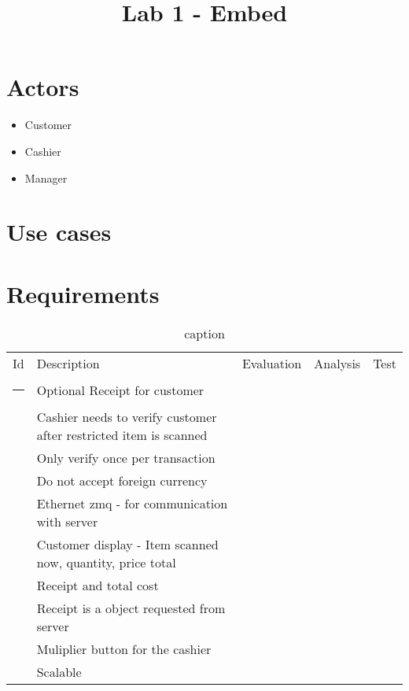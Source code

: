 \documentclass{article}
\begin{document}
\title{Lab 1 - Embed}
\date{}
\maketitle

\section{Actors}

\begin{itemize}
    \item Customer
    \item Cashier
    \item Manager
\end{itemize}

\section{Use cases}


\section{Requirements}
\begin{table}[htpb]
    \centering
    \begin{tabular}{lllll}
        Id& Description  & Evaluation  & Analysis & Test\\
        \hrule
        & Optional Receipt for customer &&& \\
        & Cashier needs to verify customer after restricted item is scanned&&&\\
        & Only verify once per transaction &&& \\
        & Do not accept foreign currency &&& \\
        & Ethernet zmq - for communication with server &&& \\
        & Customer display - Item scanned now, quantity, price total &&& \\\
        & Receipt and total cost &&& \\
        & Receipt is a object requested from server &&& \\
        & Muliplier button for the cashier &&& \\
        & Scalable &&& \\

    \end{tabular}
    \caption{caption}
    \label{tab:label}
\end{table}
\end{document}
